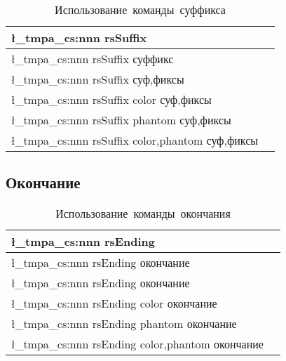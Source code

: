 \renewcommand{\arraystretch}{1.125}
\begin{table}[ht!]
    \centering
    \begin{tabular}{@{}ll@{}}
        \toprule
        \l_tmpa_cs:nnn { rsSuffix } {} { }                        \\ \midrule
        \l_tmpa_cs:nnn { rsSuffix } {} { суффикс }                \\ \midrule
        \l_tmpa_cs:nnn { rsSuffix } {} { суф,фиксы }              \\ \midrule
        \l_tmpa_cs:nnn { rsSuffix } {color} { суф,фиксы }         \\ \midrule
        \l_tmpa_cs:nnn { rsSuffix } {phantom} { суф,фиксы }       \\ \midrule
        \l_tmpa_cs:nnn { rsSuffix } {color,phantom} { суф,фиксы } \\ \midrule
        \bottomrule
    \end{tabular}
    \caption{Использование~команды~суффикса}
\end{table}

\ExplSyntaxOff{}


\subsection{Окончание}

\ExplSyntaxOn{}
\begin{tcolorbox}
\end{tcolorbox}

\renewcommand{\arraystretch}{1.125}
\begin{table}[ht!]
    \centering
    \begin{tabular}{@{}ll@{}}
        \toprule
        \l_tmpa_cs:nnn { rsEnding } {} { }                        \\ \midrule
        \l_tmpa_cs:nnn { rsEnding } {} { окончание }              \\ \midrule
        \l_tmpa_cs:nnn { rsEnding } {} { окончание }              \\ \midrule
        \l_tmpa_cs:nnn { rsEnding } {color} { окончание }         \\ \midrule
        \l_tmpa_cs:nnn { rsEnding } {phantom} { окончание }       \\ \midrule
        \l_tmpa_cs:nnn { rsEnding } {color,phantom} { окончание } \\ \midrule
        \bottomrule
    \end{tabular}
    \caption{Использование~команды~окончания}
\end{table}


